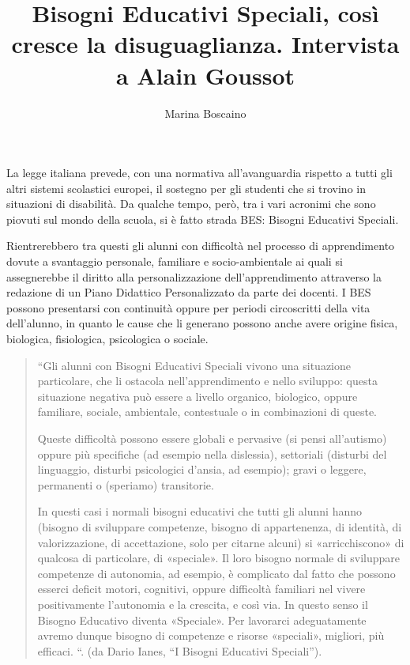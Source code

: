 \author{Marina Boscaino}
\title{Bisogni Educativi Speciali, così cresce la disuguaglianza. Intervista a Alain Goussot}
\label{cha:Boscaiono261113}
\maketitle
{}

La legge italiana prevede, con una normativa all'avanguardia rispetto a tutti gli altri sistemi scolastici europei, il sostegno per gli studenti che si trovino in situazioni di disabilità. Da qualche tempo, però, tra i vari acronimi che sono piovuti sul mondo della scuola, si è fatto strada BES: Bisogni Educativi Speciali.

Rientrerebbero tra questi gli alunni con difficoltà nel processo di apprendimento dovute a svantaggio personale, familiare e socio-ambientale ai quali si assegnerebbe il diritto alla personalizzazione dell'apprendimento attraverso la redazione di un Piano Didattico Personalizzato da parte dei docenti. I BES possono presentarsi con continuità oppure per periodi circoscritti della vita dell'alunno, in quanto le cause che li generano possono anche avere origine fisica, biologica, fisiologica, psicologica o sociale.
\begin{quote}
“Gli alunni con Bisogni Educativi Speciali vivono una situazione particolare, che li ostacola nell'apprendimento e nello sviluppo: questa situazione negativa può essere a livello organico, biologico, oppure familiare, sociale, ambientale, contestuale o in combinazioni di queste. \mancatesto

Queste difficoltà possono essere globali e pervasive (si pensi all'autismo) oppure più specifiche (ad esempio nella dislessia), settoriali (disturbi del linguaggio, disturbi psicologici d'ansia, ad esempio); gravi o leggere, permanenti o (speriamo) transitorie.

In questi casi i normali bisogni educativi che tutti gli alunni hanno (bisogno di sviluppare competenze, bisogno di appartenenza, di identità, di valorizzazione, di accettazione, solo per citarne alcuni) si «arricchiscono» di qualcosa di particolare, di «speciale». Il loro bisogno normale di sviluppare competenze di autonomia, ad esempio, è complicato dal fatto che possono esserci deficit motori, cognitivi, oppure difficoltà familiari nel vivere positivamente l'autonomia e la crescita, e così via. In questo senso il Bisogno Educativo diventa «Speciale». Per lavorarci adeguatamente avremo dunque bisogno di competenze e risorse «speciali», migliori, più efficaci. \mancatesto“. (da Dario Ianes, “I Bisogni Educativi Speciali”).
\end{quote}

